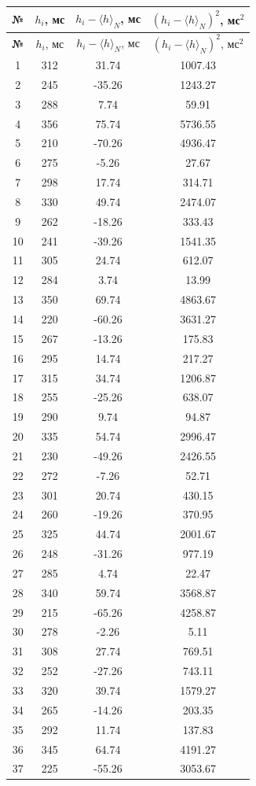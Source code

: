\documentclass[a4paper,12pt]{article}
\begin{document}
\begin{longtable}{|c|c|c|c|}
    \hline
    \textbf{№} & \boldmath\(h_i\), мс & \boldmath\(h_i - \langle h \rangle_N\), мс & \boldmath\((h_i - \langle h \rangle_N)^2\), мс\(^2\) \tabularnewline
    \hline
    \endfirsthead

    \hline
    \textbf{№} & \boldmath\(h_i\), мс & \boldmath\(h_i - \langle h \rangle_N\), мс & \boldmath\((h_i - \langle h \rangle_N)^2\), мс\(^2\) \tabularnewline
    \hline
    \endhead

    \hline
    \endfoot

    \hline
    \endlastfoot

    1 & 312 & 31.74 & 1007.43 \tabularnewline \hline
    2 & 245 & -35.26 & 1243.27 \tabularnewline \hline
    3 & 288 & 7.74 & 59.91 \tabularnewline \hline
    4 & 356 & 75.74 & 5736.55 \tabularnewline \hline
    5 & 210 & -70.26 & 4936.47 \tabularnewline \hline
    6 & 275 & -5.26 & 27.67 \tabularnewline \hline
    7 & 298 & 17.74 & 314.71 \tabularnewline \hline
    8 & 330 & 49.74 & 2474.07 \tabularnewline \hline
    9 & 262 & -18.26 & 333.43 \tabularnewline \hline
    10 & 241 & -39.26 & 1541.35 \tabularnewline \hline
    11 & 305 & 24.74 & 612.07 \tabularnewline \hline
    12 & 284 & 3.74 & 13.99 \tabularnewline \hline
    13 & 350 & 69.74 & 4863.67 \tabularnewline \hline
    14 & 220 & -60.26 & 3631.27 \tabularnewline \hline
    15 & 267 & -13.26 & 175.83 \tabularnewline \hline
    16 & 295 & 14.74 & 217.27 \tabularnewline \hline
    17 & 315 & 34.74 & 1206.87 \tabularnewline \hline
    18 & 255 & -25.26 & 638.07 \tabularnewline \hline
    19 & 290 & 9.74 & 94.87 \tabularnewline \hline
    20 & 335 & 54.74 & 2996.47 \tabularnewline \hline
    21 & 230 & -49.26 & 2426.55 \tabularnewline \hline
    22 & 272 & -7.26 & 52.71 \tabularnewline \hline
    23 & 301 & 20.74 & 430.15 \tabularnewline \hline
    24 & 260 & -19.26 & 370.95 \tabularnewline \hline
    25 & 325 & 44.74 & 2001.67 \tabularnewline \hline
    26 & 248 & -31.26 & 977.19 \tabularnewline \hline
    27 & 285 & 4.74 & 22.47 \tabularnewline \hline
    28 & 340 & 59.74 & 3568.87 \tabularnewline \hline
    29 & 215 & -65.26 & 4258.87 \tabularnewline \hline
    30 & 278 & -2.26 & 5.11 \tabularnewline \hline
    31 & 308 & 27.74 & 769.51 \tabularnewline \hline
    32 & 252 & -27.26 & 743.11 \tabularnewline \hline
    33 & 320 & 39.74 & 1579.27 \tabularnewline \hline
    34 & 265 & -14.26 & 203.35 \tabularnewline \hline
    35 & 292 & 11.74 & 137.83 \tabularnewline \hline
    36 & 345 & 64.74 & 4191.27 \tabularnewline \hline
    37 & 225 & -55.26 & 3053.67 \tabularnewline \hline

\end{longtable}
\end{document}
